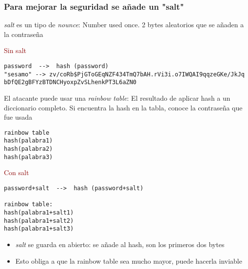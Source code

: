 \documentclass[ucs]{beamer}
\newcommand{\res}[1]{\textcolor{darkred}{#1}}
\begin{document}
\begin{frame}[fragile]

  \frametitle{Para mejorar la seguridad se añade un "salt"}
\emph{salt} es un tipo de \emph{nounce}: Number used once. 2 bytes aleatorios
que se añaden a la contraseña

\res{Sin salt}
  \begin{footnotesize}
  \begin{verbatim}
password  -->  hash (password)
"sesamo" --> zv/coRb$PjGToGEqNZF434TmQ7bAH.rVi3i.o7IWQAI9qqzeGKe/JkJq
bDfQE2gBFYzBTDNCHyoxpZvSLhenkPT3L6aZN0
  \end{verbatim}
  \end{footnotesize}


El atacante puede usar una \emph{rainbow table}: El resultado de aplicar
hash a un diccionario completo. Si encuentra la hash en la tabla, conoce
la contraseña que fue usada

  \begin{footnotesize}
  \begin{verbatim}
rainbow table
hash(palabra1)
hash(palabra2)
hash(palabra3)
  \end{verbatim}
  \end{footnotesize}


\end{frame}
\begin{frame}[fragile]

\res{Con salt}

  \begin{footnotesize}
  \begin{verbatim}
password+salt  -->  hash (password+salt)

rainbow table:
hash(palabra1+salt1)
hash(palabra1+salt2)
hash(palabra1+salt3)
  \end{verbatim}
  \end{footnotesize}


\begin{itemize}
\item
\emph{salt} se guarda en abierto: se añade al hash, son los primeros dos bytes
\item
Esto obliga a que la rainbow table sea mucho mayor, puede hacerla inviable
\end{itemize}

\end{frame}
\end{document}
